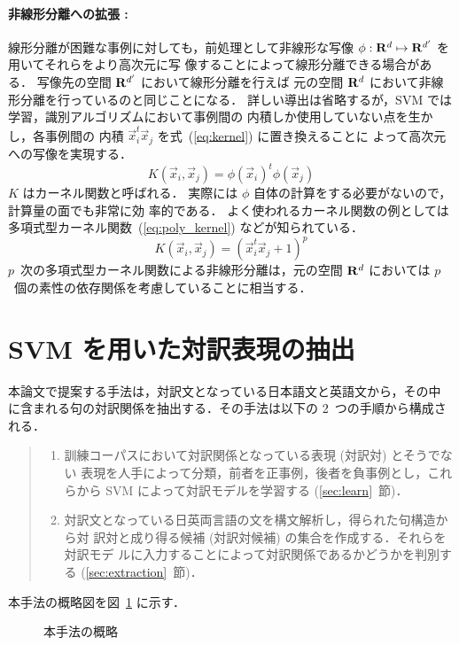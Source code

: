 \paragraph{非線形分離への拡張 :}

線形分離が困難な事例に対しても，前処理として非線形な写像
$\phi : {\bf R}^d \mapsto {\bf R}^{d'}$ を用いてそれらをより高次元に写
像することによって線形分離できる場合がある．
写像先の空間 ${\bf R}^{d'}$ において線形分離を行えば
元の空間 ${\bf R}^d$ において非線形分離を行っているのと同じことになる．
詳しい導出は省略するが，SVM では学習，識別アルゴリズムにおいて事例間の
内積しか使用していない点を生かし，各事例間の
内積 $\vec{x}_i^t \vec{x}_j$ を式~(\ref{eq:kernel}) に置き換えることに
よって高次元への写像を実現する．
\begin{equation}
  \label{eq:kernel}
  K(\vec{x}_i,\vec{x}_j) = \phi(\vec{x}_i)^t \phi(\vec{x}_j)
\end{equation}
$K$ はカーネル関数と呼ばれる．
実際には $\phi$ 自体の計算をする必要がないので，計算量の面でも非常に効
率的である．
よく使われるカーネル関数の例としては
多項式型カーネル関数~(\ref{eq:poly_kernel})
などが知られている．
\begin{equation}
  \label{eq:poly_kernel}
  K(\vec{x}_i, \vec{x}_j) = (\vec{x}_i^t \vec{x}_j + 1)^p
\end{equation}
$p$~次の多項式型カーネル関数による非線形分離は，元の空間 ${\bf R}^d$
においては $p$~個の素性の依存関係を考慮していることに相当する．

\section{SVM を用いた対訳表現の抽出}
\label{sec:SVMdict}

本論文で提案する手法は，対訳文となっている日本語文と英語文から，その中
に含まれる句の対訳関係を抽出する．その手法は以下の 2~つの手順から構成さ
れる．
\begin{quote}
  \begin{enumerate}
  \item
    訓練コーパスにおいて対訳関係となっている表現 (対訳対) とそうでない
    表現を人手によって分類，前者を正事例，後者を負事例とし，これらから
    SVM によって対訳モデルを学習する (\ref{sec:learn}~節)．
  \item
    対訳文となっている日英両言語の文を構文解析し，得られた句構造から対
    訳対と成り得る候補 (対訳対候補) の集合を作成する．それらを対訳モデ
    ルに入力することによって対訳関係であるかどうかを判別する
    (\ref{sec:extraction}~節)．
\end{enumerate}
\end{quote}
本手法の概略図を図~\ref{fig:struct} に示す．
\begin{figure}[tbp]

\begin{center}
  \caption{本手法の概略}
  \label{fig:struct}

\end{center}
\end{figure}

